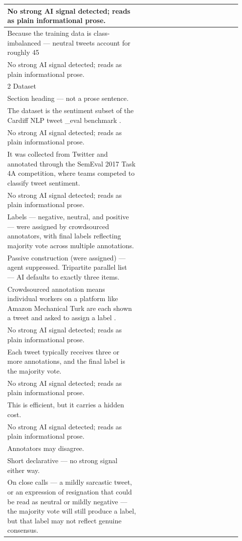 \documentclass[11pt]{article}
\begin{document}
\begin{longtable}{|p{0.55\linewidth}|p{0.40\linewidth}|}
No strong AI signal detected; reads as plain informational prose. & \\
\hline
Because the training data is class-imbalanced --- neutral tweets account for roughly 45 & \\[2pt]
\hline
No strong AI signal detected; reads as plain informational prose. & \\
\hline
2 Dataset & \\[2pt]
\hline
Section heading --- not a prose sentence. & \\
\hline
The dataset is the sentiment subset of the Cardiff NLP tweet \_eval benchmark . & \\[2pt]
\hline
No strong AI signal detected; reads as plain informational prose. & \\
\hline
It was collected from Twitter and annotated through the SemEval 2017 Task 4A competition, where teams competed to classify tweet sentiment. & \\[2pt]
\hline
No strong AI signal detected; reads as plain informational prose. & \\
\hline
Labels --- negative, neutral, and positive --- were assigned by crowdsourced annotators, with final labels reflecting majority vote across multiple annotations. & \\[2pt]
\hline
Passive construction (were assigned) --- agent suppressed. Tripartite parallel list --- AI defaults to exactly three items. & \\
\hline
Crowdsourced annotation means individual workers on a platform like Amazon Mechanical Turk are each shown a tweet and asked to assign a label . & \\[2pt]
\hline
No strong AI signal detected; reads as plain informational prose. & \\
\hline
Each tweet typically receives three or more annotations, and the final label is the majority vote. & \\[2pt]
\hline
No strong AI signal detected; reads as plain informational prose. & \\
\hline
This is efficient, but it carries a hidden cost. & \\[2pt]
\hline
No strong AI signal detected; reads as plain informational prose. & \\
\hline
Annotators may disagree. & \\[2pt]
\hline
Short declarative --- no strong signal either way. & \\
\hline
On close calls --- a mildly sarcastic tweet, or an expression of resignation that could be read as neutral or mildly negative --- the majority vote will still produce a label, but that label may not reflect genuine consensus. & \\[2pt]

\end{longtable}
\end{document}
